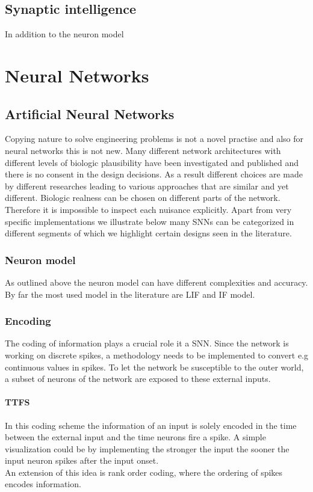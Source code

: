 \subsection{Synaptic intelligence}
In addition to the neuron model




\section{Neural Networks}

\subsection{Artificial Neural Networks}


Copying nature to solve engineering problems is not a novel practise and also for neural networks this is not new. Many different network architectures with different levels of biologic plausibility have been investigated and published and there is no consent in the design decisions. As a result different choices are made by different researches leading to various approaches that are similar and yet different. Biologic realness can be chosen on different parts of the network. Therefore it is impossible to inspect each nuisance explicitly. Apart from very specific implementations we illustrate below many \acp{SNN} can be categorized in different segments of which we highlight certain designs seen in the literature.\\

\subsubsection{Neuron model}
	As outlined above the neuron model can have different complexities and accuracy. By far the most used model in the literature are \ac{LIF} and \ac{IF} model.
\subsubsection{Encoding}
	The coding of information plays a crucial role it a \ac{SNN}. Since the network is working on discrete spikes, a methodology needs to be implemented to convert e.g continuous values in spikes. To let the network be susceptible to the outer world, a subset of neurons of the network are exposed to these external inputs.\\
	\paragraph{\ac{TTFS}}
	In this coding scheme the information of an input is solely encoded in the time between the external input and the time neurons fire a spike. A simple visualization could be by implementing the stronger the input the sooner the input neuron spikes after the input onset.\\
	An extension of this idea is rank order coding, where the ordering of spikes encodes information\cite{thorpe_spike-based_2001}.\\
